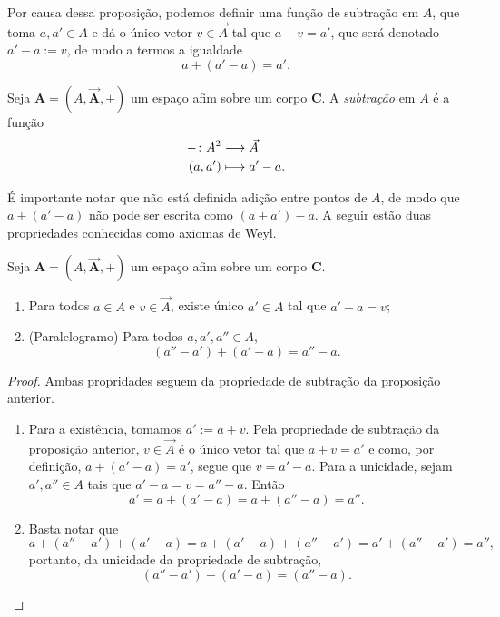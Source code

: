 Por causa dessa proposição, podemos definir uma função de subtração em $A$, que toma $a,a' \in A$ e dá o único vetor $v \in \vec{A}$ tal que $a+v=a'$, que será denotado $a'-a := v$, de modo a termos a igualdade
	\begin{equation*}
		a + (a'-a) = a'.
	\end{equation*}

\begin{definition}
Seja $\bm A = (A,\vec{\bm A},+)$ um espaço afim sobre um corpo $\bm C$. A \emph{subtração} em $A$ é a função
	\begin{align*}
		{-}\colon {A^2} &\longrightarrow {\vec{A}} \\{(a,a')} &\longmapsto a'-a.
	\end{align*}
\end{definition}

É importante notar que não está definida adição entre pontos de $A$, de modo que $a+(a'-a)$ não pode ser escrita como $(a+a')-a$. A seguir estão duas propriedades conhecidas como axiomas de Weyl.

\begin{proposition}
\label{alg:prop.afim}
Seja $\bm A = (A,\vec{\bm A},+)$ um espaço afim sobre um corpo $\bm C$.
	\begin{enumerate}
		\item Para todos $a \in A$ e $v \in \vec{A}$, existe único $a' \in A$ tal que $a'-a=v$;
		\item (Paralelogramo) Para todos $a,a',a'' \in A$,
			\begin{equation*}
				(a''-a')+(a'-a) = a''-a.
			\end{equation*}
	\end{enumerate}
\end{proposition}
\begin{proof}
Ambas propridades seguem da propriedade de subtração da proposição anterior.
	\begin{enumerate}
		\item Para a existência, tomamos $a' := a+v$. Pela propriedade de subtração da proposição anterior, $v \in \vec{A}$ é o único vetor tal que $a+v=a'$ e como, por definição, $a+(a'-a)=a'$, segue que $v=a'-a$. Para a unicidade, sejam $a',a'' \in A$ tais que $a'-a = v = a''-a$. Então
			\begin{equation*}
				a' = a+(a'-a) = a+(a''-a) = a''.
			\end{equation*}
		
		\item Basta notar que
			\begin{equation*}
				a+(a''-a')+(a'-a) = a+(a'-a)+(a''-a') = a'+(a''-a') = a'',
			\end{equation*}
		portanto, da unicidade da propriedade de subtração,
			\begin{equation*}
				(a''-a')+(a'-a) = (a''-a).
			\end{equation*}
	\end{enumerate}
\end{proof}


